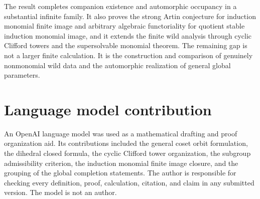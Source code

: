 \documentclass{aomart}
\theoremstyle{definition}
\theoremstyle{remark}
\begin{document}
The result completes companion existence and automorphic occupancy in a substantial infinite family. It also proves the strong Artin conjecture for induction monomial finite image and arbitrary algebraic functoriality for quotient stable induction monomial image, and it extends the finite wild analysis through cyclic Clifford towers and the supersolvable monomial theorem. The remaining gap is not a larger finite calculation. It is the construction and comparison of genuinely nonmonomial wild data and the automorphic realization of general global parameters.

\section*{Language model contribution}

An OpenAI language model was used as a mathematical drafting and proof organization aid. Its contributions included the general coset orbit formulation, the dihedral closed formula, the cyclic Clifford tower organization, the subgroup admissibility criterion, the induction monomial finite image closure, and the grouping of the global completion statements. The author is responsible for checking every definition, proof, calculation, citation, and claim in any submitted version. The model is not an author.



\end{document}
